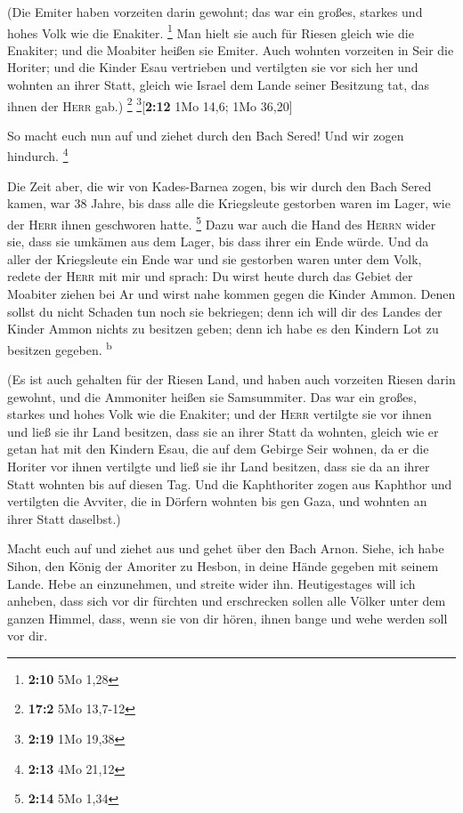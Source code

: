  (Die Emiter haben vorzeiten darin gewohnt; das war ein
großes, starkes und hohes Volk wie die Enakiter. \footnote{\textbf{2:10}
  5Mo 1,28}  Man hielt sie auch für Riesen gleich wie die
Enakiter; und die Moabiter heißen sie Emiter.  Auch
wohnten vorzeiten in Seir die Horiter; und die Kinder Esau vertrieben
und vertilgten sie vor sich her und wohnten an ihrer Statt, gleich wie
Israel dem Lande seiner Besitzung tat, das ihnen der \textsc{Herr} gab.)
\footnote{\textbf{17:2} 5Mo 13,7-12} \footnote{\textbf{2:19} 1Mo 19,38}{[}\textbf{2:12}
1Mo 14,6; 1Mo 36,20{]}

 So macht euch nun auf und ziehet durch den Bach Sered!
Und wir zogen hindurch. \footnote{\textbf{2:13} 4Mo 21,12}

 Die Zeit aber, die wir von Kades-Barnea zogen, bis wir
durch den Bach Sered kamen, war 38 Jahre, bis dass alle die Kriegsleute
gestorben waren im Lager, wie der \textsc{Herr} ihnen geschworen hatte.
\footnote{\textbf{2:14} 5Mo 1,34}  Dazu war auch die Hand
des \textsc{Herrn} wider sie, dass sie umkämen aus dem Lager, bis dass
ihrer ein Ende würde.  Und da aller der Kriegsleute ein
Ende war und sie gestorben waren unter dem Volk,  redete
der \textsc{Herr} mit mir und sprach:  Du wirst heute
durch das Gebiet der Moabiter ziehen bei Ar  und wirst
nahe kommen gegen die Kinder Ammon. Denen sollst du nicht Schaden tun
noch sie bekriegen; denn ich will dir des Landes der Kinder Ammon nichts
zu besitzen geben; denn ich habe es den Kindern Lot zu besitzen gegeben.
\textsuperscript{b}

 (Es ist auch gehalten für der Riesen Land, und haben
auch vorzeiten Riesen darin gewohnt, und die Ammoniter heißen sie
Samsummiter.  Das war ein großes, starkes und hohes Volk
wie die Enakiter; und der \textsc{Herr} vertilgte sie vor ihnen und ließ
sie ihr Land besitzen, dass sie an ihrer Statt da wohnten,
 gleich wie er getan hat mit den Kindern Esau, die auf
dem Gebirge Seir wohnen, da er die Horiter vor ihnen vertilgte und ließ
sie ihr Land besitzen, dass sie da an ihrer Statt wohnten bis auf diesen
Tag.  Und die Kaphthoriter zogen aus Kaphthor und
vertilgten die Avviter, die in Dörfern wohnten bis gen Gaza, und wohnten
an ihrer Statt daselbst.)

 Macht euch auf und ziehet aus und gehet über den Bach
Arnon. Siehe, ich habe Sihon, den König der Amoriter zu Hesbon, in deine
Hände gegeben mit seinem Lande. Hebe an einzunehmen, und streite wider
ihn.  Heutigestages will ich anheben, dass sich vor dir
fürchten und erschrecken sollen alle Völker unter dem ganzen Himmel,
dass, wenn sie von dir hören, ihnen bange und wehe werden soll vor dir.

